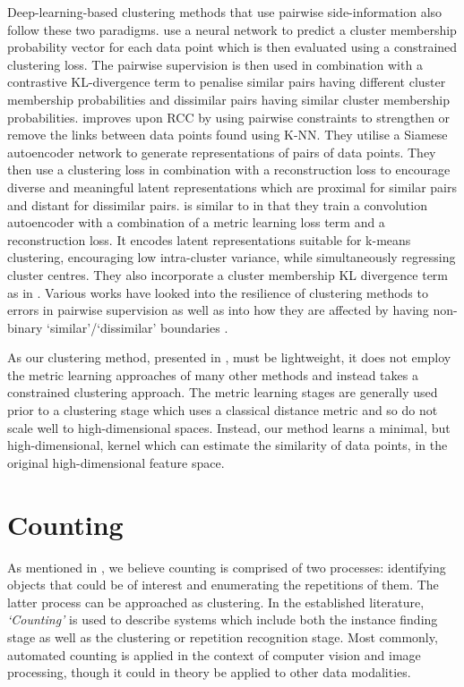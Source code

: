 \documentclass[../thesis.tex]{subfiles}
\begin{document}
Deep-learning-based clustering methods that use pairwise side-information also follow these two paradigms.
\citet{Hsu2015} use a neural network to predict a cluster membership probability vector for each data point which is then evaluated using a constrained clustering loss.
The pairwise supervision is then used in combination with a contrastive KL-divergence term to penalise similar pairs having different cluster membership probabilities and dissimilar pairs having similar cluster membership probabilities.
\citet{Fogel2019} improves upon RCC \cite{Shah2018} by using pairwise constraints to strengthen or remove the links between data points found using K-NN. 
They utilise a Siamese autoencoder network to generate representations of pairs of data points. 
They then use a clustering loss in combination with a reconstruction loss to encourage diverse and meaningful latent representations which are proximal for similar pairs and distant for dissimilar pairs.
\citet{shukla2020semi} is similar to \citet{Fogel2019} in that they train a convolution autoencoder with a combination of a metric learning loss term and a reconstruction loss. It encodes latent representations suitable for k-means clustering, encouraging low intra-cluster variance, while simultaneously regressing cluster centres.
They also incorporate a cluster membership KL divergence term as in \citet{Hsu2015}.
Various works have looked into the resilience of clustering methods to errors in pairwise supervision \cite{Mazumdar2017,choudhury2019top} as well as into how they are affected by having non-binary `similar'/`dissimilar' boundaries \cite{kim2017relaxed}.

As our clustering method, presented in , must be lightweight, it does not employ the metric learning approaches of many other methods and instead takes a constrained clustering approach. The metric learning stages are generally used prior to a clustering stage which uses a classical distance metric and so do not scale well to high-dimensional spaces. Instead, our method learns a minimal, but high-dimensional, kernel which can estimate the similarity of data points, in the original high-dimensional feature space.

\section{Counting}
As mentioned in , we believe counting is comprised of two processes: identifying objects that could be of interest and enumerating the repetitions of them. The latter process can be approached as clustering.
In the established literature, \textit{`Counting'} is used to describe systems which include both the instance finding stage as well as the clustering or repetition recognition stage.
Most commonly, automated counting is applied in the context of computer vision and image processing, though it could in theory be applied to other data modalities.
\end{document}
